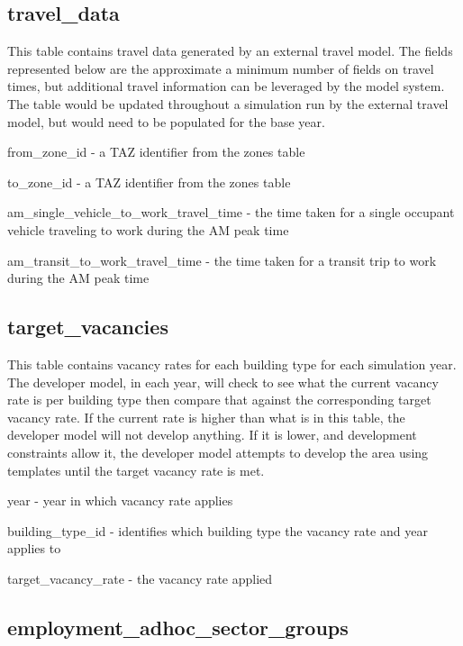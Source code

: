 \subsection{travel\_data} 

This table contains travel data generated by an external travel model. The fields represented below are the approximate a minimum number of fields on travel times, but additional travel information can be leveraged by the model system. The table would be updated throughout a simulation run by the external travel model, but would need to be populated for the base year.

\begin{description}
\item from\_zone\_id - a TAZ identifier from the zones table
\item to\_zone\_id - a TAZ identifier from the zones table
\item am\_single\_vehicle\_to\_work\_travel\_time - the time taken for a single occupant vehicle traveling to work during the AM peak time
\item am\_transit\_to\_work\_travel\_time - the time taken for a transit trip to work during the AM peak time 
\end{description}

\subsection{target\_vacancies} 

This table contains vacancy rates for each building type for each simulation year. The developer model, in each year, will check to see what the current vacancy rate is per building type then compare that against the corresponding target vacancy rate. If the current rate is higher than what is in this table, the developer model will not develop anything. If it is lower, and development constraints allow it, the developer model attempts to develop the area using templates until the target vacancy rate is met.

\begin{description}
\item year - year in which vacancy rate applies
\item building\_type\_id - identifies which building type the vacancy rate and year applies to
\item target\_vacancy\_rate - the vacancy rate applied 
\end{description}

\subsection{employment\_adhoc\_sector\_groups} 

